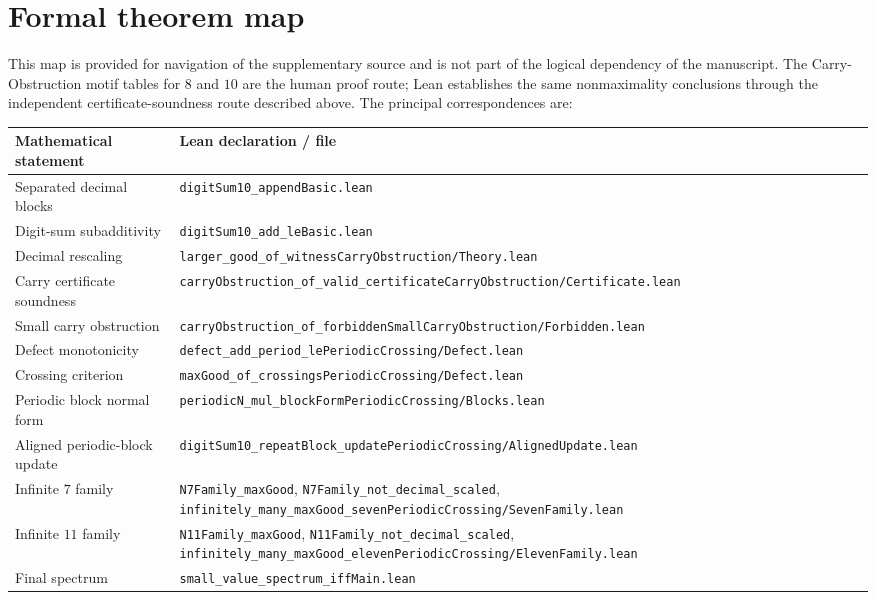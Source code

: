\documentclass[11pt]{article}
\begin{document}
\section{Formal theorem map}
This map is provided for navigation of the supplementary source and is not part of the logical dependency of the manuscript.  The Carry-Obstruction motif tables for $8$ and $10$ are the human proof route; Lean establishes the same nonmaximality conclusions through the independent certificate-soundness route described above.  The principal correspondences are:
\begin{center}
\small
\begin{tabular}{@{}P{4.6cm}P{10.0cm}@{}}
\toprule
Mathematical statement & Lean declaration / file \\
\midrule
Separated decimal blocks & \texttt{digitSum10\_append}\newline \texttt{Basic.lean} \\
Digit-sum subadditivity & \texttt{digitSum10\_add\_le}\newline \texttt{Basic.lean} \\
Decimal rescaling & \texttt{larger\_good\_of\_witness}\newline \texttt{CarryObstruction/Theory.lean} \\
Carry certificate soundness & \texttt{carryObstruction\_of\_valid\_certificate}\newline \texttt{CarryObstruction/Certificate.lean} \\
Small carry obstruction & \texttt{carryObstruction\_of\_forbiddenSmall}\newline \texttt{CarryObstruction/Forbidden.lean} \\
Defect monotonicity & \texttt{defect\_add\_period\_le}\newline \texttt{PeriodicCrossing/Defect.lean} \\
Crossing criterion & \texttt{maxGood\_of\_crossings}\newline \texttt{PeriodicCrossing/Defect.lean} \\
Periodic block normal form & \texttt{periodicN\_mul\_blockForm}\newline \texttt{PeriodicCrossing/Blocks.lean} \\
Aligned periodic-block update & \texttt{digitSum10\_repeatBlock\_update}\newline \texttt{PeriodicCrossing/AlignedUpdate.lean} \\
Infinite $7$ family & \texttt{N7Family\_maxGood}, \texttt{N7Family\_not\_decimal\_scaled}, \texttt{infinitely\_many\_maxGood\_seven}\newline \texttt{PeriodicCrossing/SevenFamily.lean} \\
Infinite $11$ family & \texttt{N11Family\_maxGood}, \texttt{N11Family\_not\_decimal\_scaled}, \texttt{infinitely\_many\_maxGood\_eleven}\newline \texttt{PeriodicCrossing/ElevenFamily.lean} \\
Final spectrum & \texttt{small\_value\_spectrum\_iff}\newline \texttt{Main.lean} \\
\bottomrule
\end{tabular}
\end{center}
\end{document}
